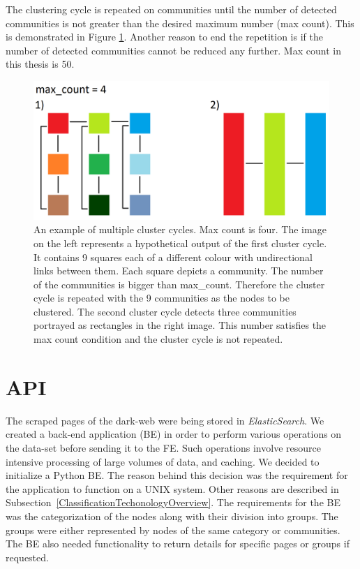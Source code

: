 The clustering cycle is repeated on communities until the number of detected communities is not greater than the desired maximum number (max count). This is demonstrated in Figure \ref{clusteringCyclesExample}. Another reason to end the repetition is if the number of detected communities cannot be reduced any further. Max count in this thesis is 50.
\begin{figure}[ht!]
  \centering
  \includegraphics[width=\textwidth]{Images/clusteringCyclesExample.png}
  \caption{An example of multiple cluster cycles. Max count is four. The image on the left represents a hypothetical output of the first cluster cycle. It contains 9 squares each of a different colour with undirectional links between them. Each square depicts a community. The number of the communities is bigger than max\_count. Therefore the cluster cycle is repeated with the 9 communities as the nodes to be clustered. The second cluster cycle detects three communities portrayed as rectangles in the right image. This number satisfies the max count condition and the cluster cycle is not repeated.}
  \label{clusteringCyclesExample}
\end{figure} 

\section{API}\label{APIDevelopment}
The scraped pages of the dark-web were being stored in \textit{ElasticSearch}. We created a back-end application (BE) in order to perform various operations on the data-set before sending it to the FE. Such operations involve resource intensive processing of large volumes of data, and caching. We decided to initialize a Python BE. The reason behind this decision was the requirement for the application to function on a UNIX system. Other reasons are described in Subsection~\ref{ClassificationTechonologyOverview}. The requirements for the BE was the categorization of the nodes along with their division into groups. The groups were either represented by nodes of the same category or communities. The BE also needed functionality to return details for specific pages or groups if requested.

